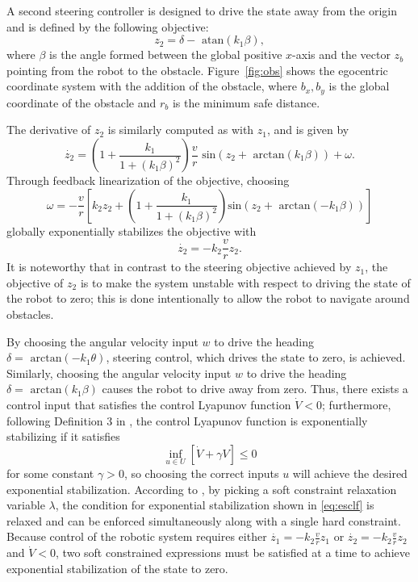 \documentclass[journal]{IEEEtran}
\begin{document}
A second steering controller is designed to drive the state away from the origin and is defined by the following objective: \begin{equation}z_2=\delta-\text{ atan}(k_1\beta),\label{z2}\end{equation} where $\beta$ is the angle formed between the global positive $x$-axis and the vector $z_b$ pointing from the robot to the obstacle. Figure~\ref{fig:obs} shows the egocentric coordinate system with the addition of the obstacle, where $b_x,b_y$ is the global coordinate of the obstacle and $r_b$ is the minimum safe distance.

The derivative of $z_2$ is similarly computed as with $z_1$, and is given by \begin{equation}\dot{z_2}=\left( 1+\frac{k_1}{1+(k_1\beta)^2}\right) \frac{v}{r}\text{ sin}(z_2+\text{ arctan}(k_1\beta))+\omega.\end{equation} Through feedback linearization of the objective, choosing \begin{equation}\omega = -\frac{v}{r}\left[ k_2 z_2+\left( 1 + \frac{k_1}{1+(k_1\beta)^2} \right) \text{sin}(z_2+\text{ arctan}(-k_1\beta))\right]\end{equation} globally exponentially stabilizes the objective with \begin{equation}\dot{z_2}=-k_2\frac{v}{r}z_2.\end{equation} It is noteworthy that in contrast to the steering objective achieved by $z_1$, the objective of $z_2$ is to make the system unstable with respect to driving the state of the robot to zero; this is done intentionally to allow the robot to navigate around obstacles.

By choosing the angular velocity input $w$ to drive the heading $\delta=\text{ arctan}(-k_1\theta)$, steering control, which drives the state to zero, is achieved. Similarly, choosing the angular velocity input $w$ to drive the heading $\delta=\text{ arctan}(k_1\beta)$ causes the robot to drive away from zero. Thus, there exists a control input that satisfies the control Lyapunov function $\dot{V}<0$; furthermore, following Definition 3 in \cite{ames2014esclf}, the control Lyapunov function is exponentially stabilizing if it satisfies
\begin{equation}
\inf_{u\in U}\left[ \dot{V}+\gamma V \right] \leq 0
\label{eq:esclf}
\end{equation}
for some constant $\gamma >0$, so choosing the correct inputs $u$ will achieve the desired exponential stabilization. According to \cite{amesACC}, by picking a soft constraint relaxation variable $\lambda$, the condition for exponential stabilization shown in \eqref{eq:esclf} is relaxed and can be enforced simultaneously along with a single hard constraint. Because control of the robotic system requires either $\dot{z_1}=-k_2\frac{v}{r}z_1$ or $\dot{z_2}=-k_2\frac{v}{r}z_2$ and $\dot{V}<0$, two soft constrained expressions must be satisfied at a time to achieve exponential stabilization of the state to zero.
\end{document}
